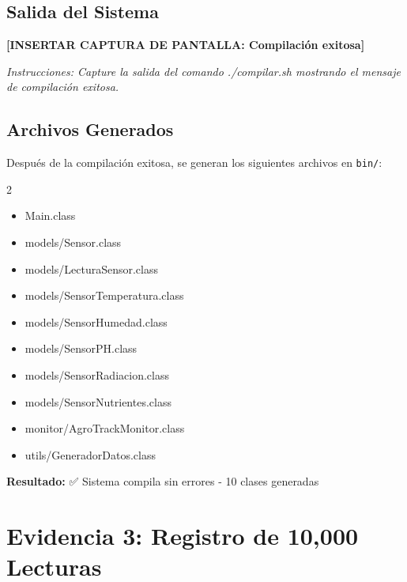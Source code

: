 \documentclass[12pt,a4paper]{article}
\begin{document}
\subsection{Salida del Sistema}

\begin{tcolorbox}[colback=green!5,colframe=green!75!black,title=\textbf{Output de Compilación}]
\vspace{0.5cm}
\textbf{[INSERTAR CAPTURA DE PANTALLA: Compilación exitosa]}

\textit{Instrucciones: Capture la salida del comando ./compilar.sh mostrando el mensaje de compilación exitosa.}
\vspace{0.5cm}
\end{tcolorbox}

\subsection{Archivos Generados}

Después de la compilación exitosa, se generan los siguientes archivos en \texttt{bin/}:

\begin{multicols}{2}
\begin{itemize}[leftmargin=1cm]
    \item Main.class
    \item models/Sensor.class
    \item models/LecturaSensor.class
    \item models/SensorTemperatura.class
    \item models/SensorHumedad.class
    \item models/SensorPH.class
    \item models/SensorRadiacion.class
    \item models/SensorNutrientes.class
    \item monitor/AgroTrackMonitor.class
    \item utils/GeneradorDatos.class
\end{itemize}
\end{multicols}

\textbf{Resultado:} ✅ Sistema compila sin errores - 10 clases generadas


\section{Evidencia 3: Registro de 10,000 Lecturas}
\end{document}
